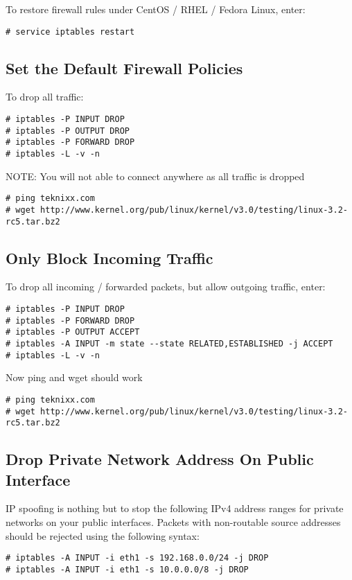 \documentclass[dvipdfm]{book}
\begin{document}
To restore firewall rules under CentOS / RHEL / Fedora Linux, enter:
\begin{verbatim}
# service iptables restart
\end{verbatim}

\subsection{Set the Default Firewall Policies}

To drop all traffic:
\begin{verbatim}
# iptables -P INPUT DROP
# iptables -P OUTPUT DROP
# iptables -P FORWARD DROP
# iptables -L -v -n
\end{verbatim}

NOTE: You will not able to connect anywhere as all traffic is dropped
\begin{verbatim}
# ping teknixx.com
# wget http://www.kernel.org/pub/linux/kernel/v3.0/testing/linux-3.2-rc5.tar.bz2
\end{verbatim}

\subsection{Only Block Incoming Traffic}

To drop all incoming / forwarded packets, but allow outgoing traffic, enter:
\begin{verbatim}
# iptables -P INPUT DROP
# iptables -P FORWARD DROP
# iptables -P OUTPUT ACCEPT
# iptables -A INPUT -m state --state RELATED,ESTABLISHED -j ACCEPT
# iptables -L -v -n
\end{verbatim}

Now ping and wget should work
\begin{verbatim}
# ping teknixx.com
# wget http://www.kernel.org/pub/linux/kernel/v3.0/testing/linux-3.2-rc5.tar.bz2
\end{verbatim}

\subsection{Drop Private Network Address On Public Interface}

IP spoofing is nothing but to stop the following IPv4 address ranges
for private networks on your public interfaces. Packets with
non-routable source addresses should be rejected using the following
syntax:
\begin{verbatim}
# iptables -A INPUT -i eth1 -s 192.168.0.0/24 -j DROP
# iptables -A INPUT -i eth1 -s 10.0.0.0/8 -j DROP
\end{verbatim}
\end{document}
